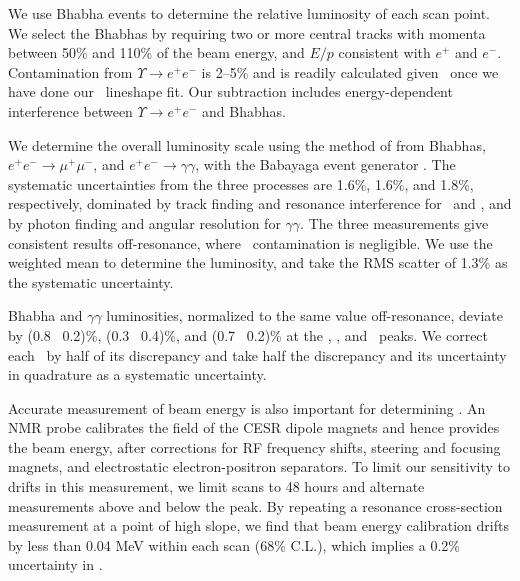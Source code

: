 \documentclass[aps,prl,superscriptaddress,showpacs,floatfix]{revtex4}
\begin{document}
We use Bhabha events to determine the relative luminosity of each scan
point.  We select the Bhabhas by requiring two or more central tracks
with momenta between 50\% and 110\% of the beam energy, and $E/p$
consistent with $e^+$ and $e^-$.  Contamination from $\Upsilon \to
e^+e^-$ is 2--5\% and is readily calculated given \bmm\ once we have
done our \ups\ lineshape fit.  Our subtraction includes
energy-dependent interference between $\Upsilon \to e^+e^-$ and
Bhabhas.

We determine the overall luminosity scale using the method of
\cite{oldlumi} from Bhabhas, $e^+e^- \to \mu^+\mu^-$, and $e^+e^- \to
\gamma\gamma$, with the {\textsc Babayaga} event generator
\cite{babayaga}.  The systematic uncertainties from the three
processes are 1.6\%, 1.6\%, and 1.8\%, respectively, dominated by
track finding and resonance interference for \ee\ and \mm, and by
photon finding and angular resolution for $\gamma\gamma$.  The three
measurements give consistent results off-resonance, where \ups\
contamination is negligible.  We use the weighted mean to determine
the luminosity, and take the RMS scatter of 1.3\% as the systematic
uncertainty.

Bhabha and $\gamma\gamma$ luminosities, normalized to the same value
off-resonance, deviate by (0.8 \PM\ 0.2)\%, (0.3 \PM\ 0.4)\%, and (0.7
\PM\ 0.2)\% at the \us, \uss, and \usss\ peaks.  We correct each \gee\
by half of its discrepancy and take half the discrepancy and its
uncertainty in quadrature as a systematic uncertainty.

Accurate measurement of beam energy is also important for determining
\gee.  An NMR probe calibrates the field of the CESR dipole magnets
and hence provides the beam energy, after corrections for RF frequency
shifts, steering and focusing magnets, and electrostatic
electron-positron separators.  To limit our sensitivity to drifts in
this measurement, we limit scans to 48 hours and alternate
measurements above and below the peak.  By repeating a resonance
cross-section measurement at a point of high slope, we find that beam
energy calibration drifts by less than 0.04 MeV within each scan (68\%
C.L.), which implies a 0.2\% uncertainty in \gee.
\end{document}
